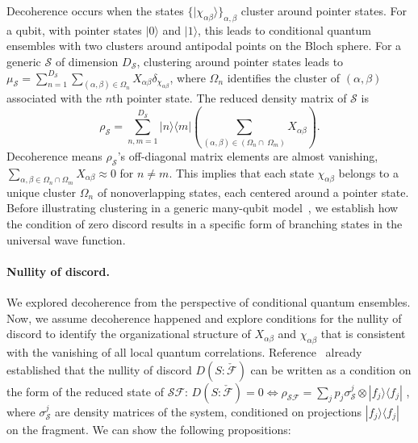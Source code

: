 \documentclass[a4paper,11pt,accepted=2024-09-14]{quantumarticle}
\newcommand{\+}         {\dagger}
\newcommand{\mc}[1]{\mathcal{#1}}
\begin{document}
Decoherence occurs when the states $\{| \chi_{\alpha \beta}\rangle\}_{\alpha,\beta}$ cluster around pointer states. For a qubit, with pointer states $|0 \rangle$ and $|1 \rangle$, this leads to {conditional quantum ensemble}s with two clusters around antipodal points on the Bloch sphere. For a generic $\mc{S}$ of dimension $D_{\mc{S}}$, clustering around pointer states leads to
$\mu_{\mc{S}} = \sum_{n=1}^{D_{\mc{S}}} \sum_{(\alpha,\beta)\in \Omega_n} X_{\alpha \beta} \delta_{\chi_{\alpha \beta}}$,
where $\Omega_{n}$ identifies the cluster of $(\alpha, \beta)$ associated with the $n$th pointer state. The reduced density matrix of $\mc{S}$ is
\begin{equation}
\rho_{\mc{S}}= \sum^{D_{\mc{S}}}_{n,m=1} |n\rangle \langle m| \left(\sum_{(\alpha, \beta)\in (\Omega_{n} \cap \ \Omega_{m})} X_{\alpha \beta}\right).
\end{equation}
Decoherence means $\rho_{\mc{S}}$'s off-diagonal matrix elements are almost vanishing, $\sum_{\alpha,\beta \in \Omega_n \cap \Omega_m} X_{\alpha \beta}\approx 0$ for $n \neq m$. This implies that each state $\chi_{\alpha \beta}$ belongs to a unique cluster $\Omega_n$ of  nonoverlapping states, each centered around a pointer state. Before illustrating  clustering in a generic many-qubit model~\cite{touil2021eavesdropping}, we establish how the condition of zero discord results in a specific form of branching states in the universal wave function.

\paragraph{Nullity of discord.}
We explored decoherence from the perspective of {conditional quantum ensemble}s. Now, we assume decoherence happened and explore conditions for the nullity of discord to identify the organizational structure of $X_{\alpha \beta}$ and $\chi_{\alpha \beta}$ that is consistent with the vanishing of all local quantum correlations. Reference~\cite{null} already established that the nullity of discord $D(S:\check{\mc{F}})$ can be written as a condition on the form of the reduced state of $\mc{SF}$: $D(S:\check{\mc{F}})= 0 \Leftrightarrow \rho_{\mc{SF}}= \sum_{j} p_j \sigma^{j}_{\mc{S}} \otimes |f_j\rangle \langle f_j|$ {, where $\sigma^{j}_{\mc{S}}$ are density matrices of the system, conditioned on projections $|f_j\rangle \langle f_j|$ on the fragment}. We can show {the following propositions:}
\end{document}
